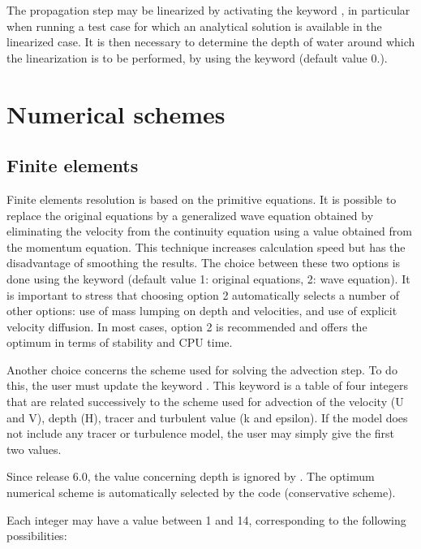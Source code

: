  The propagation step may be linearized by activating the keyword , in particular when running a test case for which an analytical solution is available in the linearized case. It is then necessary to determine the depth of water around which the linearization is to be performed, by using the keyword   (default value 0.).


\section{ Numerical schemes}

\subsection{Finite elements}
Finite elements resolution is based on the primitive equations. It is possible to replace the original equations by a generalized wave equation obtained by eliminating the velocity from the continuity equation using a value obtained from the momentum equation. This technique increases calculation speed but has the disadvantage of smoothing the results. The choice between these two options is done using the keyword  (default value 1: original equations, 2: wave equation). It is important to stress that choosing option 2 automatically selects a number of other options: use of mass lumping on depth and velocities, and use of explicit velocity diffusion.
 In most cases, option 2 is recommended and offers the optimum in terms of stability and CPU time.

 Another choice concerns the scheme used for solving the advection step. To do this, the user must update the keyword . This keyword is a table of four integers that are related successively to the scheme used for advection of the velocity (U and V), depth (H), tracer and turbulent value (k and epsilon). If the model does not include any tracer or turbulence model, the user may simply give the first two values.

 Since release 6.0, the value concerning depth is ignored by . The optimum numerical scheme is automatically selected by the code (conservative scheme).

 Each integer may have a value between 1 and 14, corresponding to the following possibilities:

